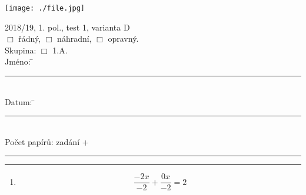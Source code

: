 \documentclass[czech, a4paper, 12pt]{exam}
\begin{document}
\begin{minipage}{9cm}
    \texttt{[image: ./file.jpg]}
\end{minipage}
\begin{minipage}{5cm}
\begin{tabbing}
2018/19, 1. pol., test 1, varianta D\\[.1cm]
$\Box$ řádný, \hspace{.2cm} $\Box$ náhradní, \hspace{.2cm} $\Box$ opravný. \\[.1cm]
Skupina:
    $\Box$ 1.A. \\[.1cm]
Jméno: \hspace{2cm} \= \rule{4.7cm}{.1mm} \\[.1cm]
Datum: \hspace{2cm} \= \rule{4.7cm}{.1mm} \\[.1cm]
Počet papírů:\> zadání + \rule{1.2cm}{.1mm}
\end{tabbing}
\end{minipage}

\vspace{.3cm}
\begin{center}
\rule{17cm}{.7mm}
\end{center}
\vspace{.3cm}



\begin{enumerate}


    \item
    $$ \frac{ -2 x}{ -2 } + \frac{ 0 x}{ -2 } = 2 $$




\end{enumerate}
\end{document}
